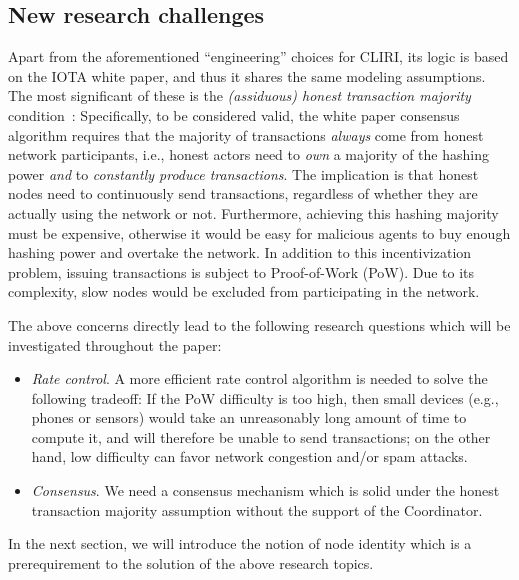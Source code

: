 \documentclass[../main.tex]{subfiles}
\begin{document}
	\subsection{New research challenges}\label{sec:cliri_limitations}
	Apart from the aforementioned ``engineering'' choices for CLIRI, its logic is based on the IOTA white paper, and thus it shares the same modeling assumptions. The most significant of these is the \textit{(assiduous) honest transaction majority} condition~\cite{bramas2018}: Specifically, to be considered valid, the white paper consensus algorithm requires that the majority of transactions \textit{always} come from honest network participants, i.e., honest actors need to \textit{own} a majority of the hashing power \textit{and} to \textit{constantly produce transactions}. The implication is that honest nodes need to continuously send transactions, regardless of whether they are actually using the network or not. Furthermore, achieving this hashing majority must be expensive, otherwise it would be easy for malicious agents to buy enough hashing power and overtake the network. In addition to this incentivization problem, issuing transactions is subject to Proof-of-Work (PoW). Due to its complexity, slow nodes would be excluded from participating in the network.
	
	The above concerns directly lead to the following research questions which will be investigated throughout the paper:
	
	\begin{itemize}
		\item \textit{Rate control}. A more efficient rate control algorithm is needed to solve the following tradeoff: If the PoW difficulty is too high, then small devices (e.g., phones or sensors) would take an unreasonably long amount of time to compute it, and will therefore be unable to send transactions; on the other hand, low difficulty can favor network congestion and/or spam attacks.
		
		\item \textit{Consensus}. We need a consensus mechanism which is solid under the honest transaction majority assumption without the support of the Coordinator.
	\end{itemize}
		
	In the next section, we will introduce the notion of node identity which is a prerequirement to the solution of the above research topics.
\end{document}
